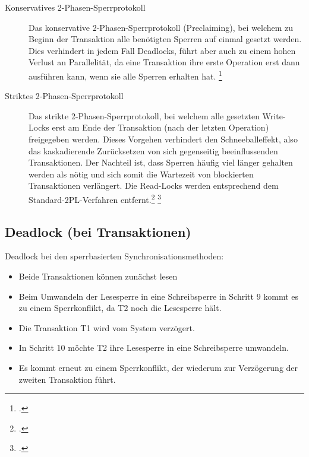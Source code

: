 \documentclass{lehramt-informatik-haupt}
\begin{document}
\begin{description}

\item[Konservatives 2-Phasen-Sperrprotokoll]

Das konservative 2-Phasen-Sperrprotokoll (Preclaiming), bei welchem zu
Beginn der Transaktion alle benötigten Sperren auf einmal gesetzt
werden. Dies verhindert in jedem Fall Deadlocks, führt aber auch zu
einem hohen Verlust an Parallelität, da eine Transaktion ihre erste
Operation erst dann ausführen kann, wenn sie alle Sperren erhalten hat.
\footcite[11.7.2 Preclaiming zur Vermeidung von Verklemmungen, Seite 350]{kemper}

\item[Striktes 2-Phasen-Sperrprotokoll]

Das strikte 2-Phasen-Sperrprotokoll, bei welchem alle gesetzten
Write-Locks erst am Ende der Transaktion (nach der letzten Operation)
freigegeben werden. Dieses Vorgehen verhindert den Schneeballeffekt,
also das kaskadierende Zurücksetzen von sich gegenseitig beeinflussenden
Transaktionen. Der Nachteil ist, dass Sperren häufig viel länger
gehalten werden als nötig und sich somit die Wartezeit von blockierten
Transaktionen verlängert. Die Read-Locks werden entsprechend dem
Standard-2PL-Verfahren entfernt.\footcite[11.6.3 Kaskadierendes Rücksetzen, Seite 348]{kemper}
\footcite{wiki:sperrverfahren}
\end{description}

%

\subsection{Deadlock (bei Transaktionen)}

Deadlock bei den sperrbasierten Synchronisationsmethoden:

\begin{itemize}
\item Beide Transaktionen können zunächst lesen

\item Beim Umwandeln der Lesesperre in eine Schreibsperre in Schritt 9
kommt es zu einem Sperrkonflikt, da T2 noch die Lesesperre hält.

\item Die Transaktion T1 wird vom System verzögert.

\item In Schritt 10 möchte T2 ihre Lesesperre in eine Schreibsperre
umwandeln.

\item Es kommt erneut zu einem Sperrkonflikt, der wiederum zur
Verzögerung der zweiten Transaktion führt.
\end{itemize}
\end{document}
